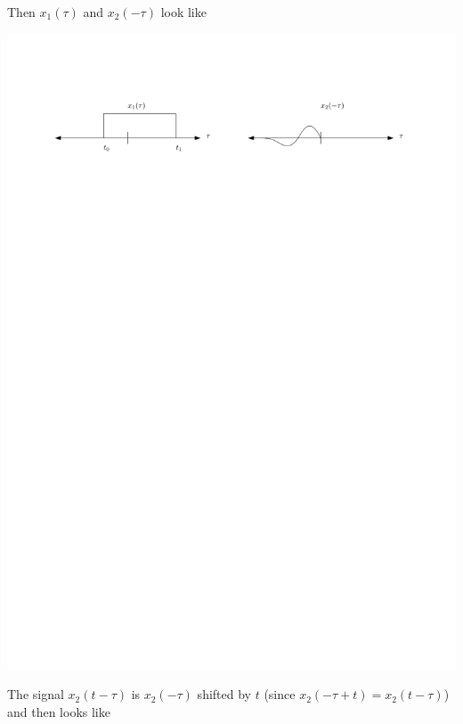 Then $x_1(\tau)$ and $x_2(-\tau)$ look like
\begin{center}
  \includegraphics[scale=1]{graphics/convolution-explain2.pdf}
\end{center}
The signal $x_2(t-\tau)$ is $x_2(-\tau)$ shifted by $t$ (since $x_2(-\tau+t)= x_2(t-\tau)$) and then looks like
